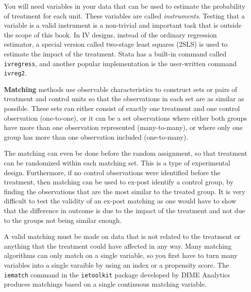 You will need variables in your data
that can be used to estimate the probability of treatment for each unit.
These variables are called \textit{instruments}.
Testing that a variable is a valid instrument is a non-trivial and important task
that is outside the scope of this book.
In IV designs, instead of the ordinary regression estimator,
a special version called two-stage least squares (2SLS) is used
to estimate the impact of the treatment.
Stata has a built-in command called \texttt{ivregress},
and another popular implementation is the user-written command \texttt{ivreg2}.


\textbf{Matching}
methods use observable characteristics to construct
sets or pairs of treatment and control units
so that the observations in each set are as similar as possible. 
These sets can either consist of exactly one treatment and one control observation (one-to-one),
or it can be a set observations where either
both groups have more than one observation represented (many-to-many),
or where only one group has more than one observation included (one-to-many).

The matching can even be done before the random assignment,
so that treatment can be randomized within each matching set.
This is a type of experimental design.
Furthermore, if no control observations were identified before the treatment,
then matching can be used to ex-post identify a control group,
by finding the observations that are the most similar to the treated group.
It is very difficult to test the validity of an ex-post matching
as one would have to show that the difference in outcome is
due to the impact of the treatment and not due to the groups not being similar enough.

A valid matching must be made on data that is not related to the treatment
or anything that the treatment could have affected in any way.
Many matching algorithms can only match on a single variable,
so you first have to turn many variables into a single varaible
by using an index or a propensity score.
The \texttt{iematch}
command in the \texttt{ietoolkit} package developed by DIME Analytics
produces matchings based on a single continuous matching variable.




